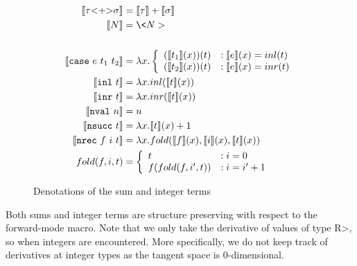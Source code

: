   \begin{figure}
    \centering
    \begin{equation*}
      \begin{split}
        \llbracket \tau \text{<+>} \sigma \rrbracket &= \llbracket \tau \rrbracket + \llbracket \sigma \rrbracket \\
        \llbracket N \rrbracket &= \<N> \\
        \\
        \llbracket \case{e}{t_1}{t_2} \rrbracket &= \lambda x.
          \left\{
            \begin{array}{ll}
              (\llbracket t_1 \rrbracket(x))(t)
                & : \llbracket e \rrbracket(x) = inl(t) \\
              (\llbracket t_2 \rrbracket(x))(t)
                & : \llbracket e \rrbracket(x) = inr(t) \\
            \end{array}
          \right. \\
        \llbracket \inl{t} \rrbracket &= \lambda x. inl(\llbracket t \rrbracket(x)) \\
        \llbracket \inr{t} \rrbracket &= \lambda x. inr(\llbracket t \rrbracket(x)) \\
        \llbracket \nval{n} \rrbracket &= n \\
        \llbracket \nsucc{t} \rrbracket &= \lambda x. \llbracket t \rrbracket(x) + 1 \\
        \llbracket \nrec{f}{i}{t} \rrbracket &= \lambda x. fold(\llbracket f \rrbracket(x), \llbracket i \rrbracket(x), \llbracket t \rrbracket(x)) \\
        fold(f, i, t) &=
          \left\{
            \begin{array}{ll}
              t &: i = 0 \\
              f(fold(f, i', t))
                &: i = i' + 1 \\
            \end{array}
          \right. \\
      \end{split}
    \end{equation*}
    \caption{Denotations of the sum and integer terms}
    \label{eqn:denotation_sums_prim}
  \end{figure}

  Both sums and integer terms are structure preserving with respect to the forward-mode macro.
  Note that we only take the derivative of values of type \<R>, so when integers are encountered.
  More specifically, we do not keep track of derivatives at integer types as the tangent space is $0$-dimensional.

